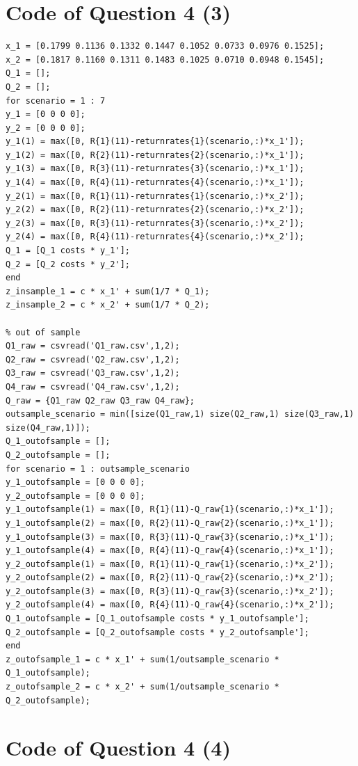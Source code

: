 \documentclass[11pt,a4paper]{article}
\begin{document}
\section*{Code of Question 4 (3)}
\begin{lstlisting}
x_1 = [0.1799 0.1136 0.1332 0.1447 0.1052 0.0733 0.0976 0.1525];
x_2 = [0.1817 0.1160 0.1311 0.1483 0.1025 0.0710 0.0948 0.1545];
Q_1 = [];
Q_2 = [];
for scenario = 1 : 7
y_1 = [0 0 0 0];
y_2 = [0 0 0 0];
y_1(1) = max([0, R{1}(11)-returnrates{1}(scenario,:)*x_1']);
y_1(2) = max([0, R{2}(11)-returnrates{2}(scenario,:)*x_1']);
y_1(3) = max([0, R{3}(11)-returnrates{3}(scenario,:)*x_1']);
y_1(4) = max([0, R{4}(11)-returnrates{4}(scenario,:)*x_1']);
y_2(1) = max([0, R{1}(11)-returnrates{1}(scenario,:)*x_2']);
y_2(2) = max([0, R{2}(11)-returnrates{2}(scenario,:)*x_2']);
y_2(3) = max([0, R{3}(11)-returnrates{3}(scenario,:)*x_2']);
y_2(4) = max([0, R{4}(11)-returnrates{4}(scenario,:)*x_2']);
Q_1 = [Q_1 costs * y_1'];
Q_2 = [Q_2 costs * y_2'];
end
z_insample_1 = c * x_1' + sum(1/7 * Q_1);
z_insample_2 = c * x_2' + sum(1/7 * Q_2);

% out of sample
Q1_raw = csvread('Q1_raw.csv',1,2);
Q2_raw = csvread('Q2_raw.csv',1,2);
Q3_raw = csvread('Q3_raw.csv',1,2);
Q4_raw = csvread('Q4_raw.csv',1,2);
Q_raw = {Q1_raw Q2_raw Q3_raw Q4_raw};
outsample_scenario = min([size(Q1_raw,1) size(Q2_raw,1) size(Q3_raw,1) size(Q4_raw,1)]);
Q_1_outofsample = [];
Q_2_outofsample = [];
for scenario = 1 : outsample_scenario
y_1_outofsample = [0 0 0 0];
y_2_outofsample = [0 0 0 0];
y_1_outofsample(1) = max([0, R{1}(11)-Q_raw{1}(scenario,:)*x_1']);
y_1_outofsample(2) = max([0, R{2}(11)-Q_raw{2}(scenario,:)*x_1']);
y_1_outofsample(3) = max([0, R{3}(11)-Q_raw{3}(scenario,:)*x_1']);
y_1_outofsample(4) = max([0, R{4}(11)-Q_raw{4}(scenario,:)*x_1']);
y_2_outofsample(1) = max([0, R{1}(11)-Q_raw{1}(scenario,:)*x_2']);
y_2_outofsample(2) = max([0, R{2}(11)-Q_raw{2}(scenario,:)*x_2']);
y_2_outofsample(3) = max([0, R{3}(11)-Q_raw{3}(scenario,:)*x_2']);
y_2_outofsample(4) = max([0, R{4}(11)-Q_raw{4}(scenario,:)*x_2']);
Q_1_outofsample = [Q_1_outofsample costs * y_1_outofsample'];
Q_2_outofsample = [Q_2_outofsample costs * y_2_outofsample'];
end
z_outofsample_1 = c * x_1' + sum(1/outsample_scenario * Q_1_outofsample);
z_outofsample_2 = c * x_2' + sum(1/outsample_scenario * Q_2_outofsample);
\end{lstlisting}

\section*{Code of Question 4 (4)}
\end{document}
